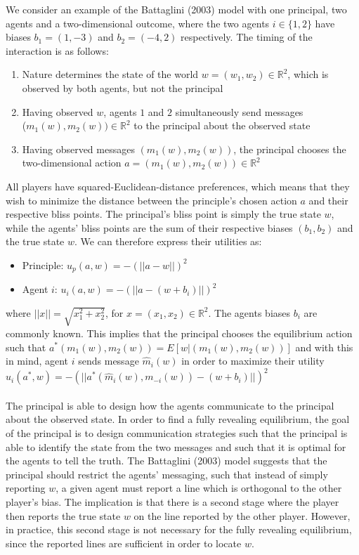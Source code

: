\documentclass[a4paper]{article}
\begin{document}
	We consider an example of the Battaglini (2003) model with one principal, two agents and a two-dimensional outcome, where the two agents $i\in\{1,2\}$ have biases $b_1=(1,-3)$ and $b_2=(-4,2)$ respectively. The timing of the interaction is as follows:
	\begin{enumerate}
		\item Nature determines the state of the world $w=(w_1,w_2)\in\mathbb{R}^2$, which is observed by both agents, but not the principal
		\item Having observed $w$, agents $1$ and $2$ simultaneously send messages\\ ($m_1(w),m_2(w))\in\mathbb{R}^2$ to the principal about the observed state
		\item Having observed messages $(m_1(w),m_2(w))$, the principal chooses the two-dimensional action $a=(m_1(w),m_2(w))\in\mathbb{R}^2$
	\end{enumerate}
	All players have squared-Euclidean-distance preferences, which means that they wish to minimize the distance between the principle's chosen action $a$ and their respective bliss points. The principal's bliss point is simply the true state $w$, while the agents' bliss points are the sum of their respective biases $(b_1,b_2)$ and the true state $w$. We can therefore express their utilities as:
	\begin{itemize}
		\item Principle: $u_p(a,w)=-(||a-w||)^2$
		\item Agent $i$: $u_i(a,w)=-(||a-(w+b_i)||)^2$
	\end{itemize}
	where $||x||=\sqrt{x_1^2+x_2^2}$, for $x=(x_1,x_2)\in\mathbb{R}^2$. The agents biases $b_i$ are commonly known. This implies that the principal chooses the equilibrium action such that $a^*(m_1(w),m_2(w))=E[w|(m_1(w),m_2(w))]$ and with this in mind, agent $i$ sends message $\hat{m}_i(w)$ in order to maximize their utility $u_i(a^*,w)=-(||a^*(\hat{m}_i(w),m_{-i}(w))-(w+b_i)||)^2$\\\\
	The principal is able to design how the agents communicate to the principal about the observed state. In order to find a fully revealing equilibrium, the goal of the principal is to design communication strategies such that the principal is able to identify the state from the two messages and such that it is optimal for the agents to tell the truth. The Battaglini (2003) model suggests that the principal should restrict the agents' messaging, such that instead of simply reporting $w$, a given agent must report a line which is orthogonal to the other player's bias. The implication is that there is a second stage where the player then reports the true state $w$ on the line reported by the other player. However, in practice, this second stage is not necessary for the fully revealing equilibrium, since the reported lines are sufficient in order to locate $w$.\\\\
\end{document}
